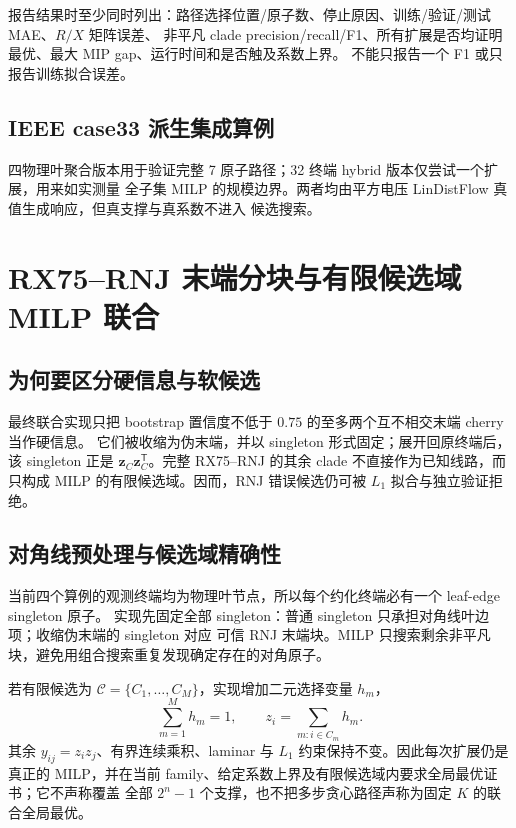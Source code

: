\documentclass[UTF8,11pt]{ctexart}
\begin{document}
报告结果时至少同时列出：路径选择位置/原子数、停止原因、训练/验证/测试 MAE、$R/X$ 矩阵误差、
非平凡 clade precision/recall/F1、所有扩展是否均证明最优、最大 MIP gap、运行时间和是否触及系数上界。
不能只报告一个 F1 或只报告训练拟合误差。

\subsection{IEEE case33 派生集成算例}

四物理叶聚合版本用于验证完整 7 原子路径；32 终端 hybrid 版本仅尝试一个扩展，用来如实测量
全子集 MILP 的规模边界。两者均由平方电压 LinDistFlow 真值生成响应，但真支撑与真系数不进入
候选搜索。


\section{RX75--RNJ 末端分块与有限候选域 MILP 联合}

\subsection{为何要区分硬信息与软候选}

最终联合实现只把 bootstrap 置信度不低于 $0.75$ 的至多两个互不相交末端 cherry 当作硬信息。
它们被收缩为伪末端，并以 singleton 形式固定；展开回原终端后，该 singleton 正是
$\bm z_C\bm z_C^{\mathsf T}$。完整 RX75--RNJ 的其余 clade 不直接作为已知线路，而只构成
MILP 的有限候选域。因而，RNJ 错误候选仍可被 $L_1$ 拟合与独立验证拒绝。

\subsection{对角线预处理与候选域精确性}

当前四个算例的观测终端均为物理叶节点，所以每个约化终端必有一个 leaf-edge singleton 原子。
实现先固定全部 singleton：普通 singleton 只承担对角线叶边项；收缩伪末端的 singleton 对应
可信 RNJ 末端块。MILP 只搜索剩余非平凡块，避免用组合搜索重复发现确定存在的对角原子。

若有限候选为 $\mathcal C=\{C_1,\ldots,C_M\}$，实现增加二元选择变量 $h_m$，
\begin{equation}
 \sum_{m=1}^{M}h_m=1,\qquad
 z_i=\sum_{m:i\in C_m}h_m .
\end{equation}
其余 $y_{ij}=z_i z_j$、有界连续乘积、laminar 与 $L_1$ 约束保持不变。因此每次扩展仍是
真正的 MILP，并在当前 family、给定系数上界及有限候选域内要求全局最优证书；它不声称覆盖
全部 $2^n-1$ 个支撑，也不把多步贪心路径声称为固定 $K$ 的联合全局最优。
\end{document}
